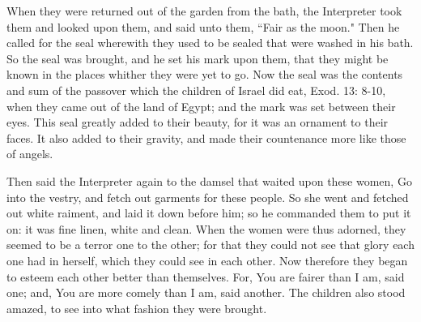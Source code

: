 When they were returned out of the garden from the bath, the Interpreter took them and looked upon them, and said unto them, ``Fair as the moon." Then he called for the seal wherewith they used to be sealed that were washed in his bath. So the seal was brought, and he set his mark upon them, that they might be known in the places whither they were yet to go. Now the seal was the contents and sum of the passover which the children of Israel did eat, Exod. 13: 8-10, when they came out of the land of Egypt; and the mark was set between their eyes. This seal greatly added to their beauty, for it was an ornament to their faces. It also added to their gravity, and made their countenance more like those of angels.

Then said the Interpreter again to the damsel that waited upon these women, Go into the vestry, and fetch out garments for these people. So she went and fetched out white raiment, and laid it down before him; so he commanded them to put it on: it was fine linen, white and clean. When the women were thus adorned, they seemed to be a terror one to the other; for that they could not see that glory each one had in herself, which they could see in each other. Now therefore they began to esteem each other better than themselves. For, You are fairer than I am, said one; and, You are more comely than I am, said another. The children also stood amazed, to see into what fashion they were brought. 
